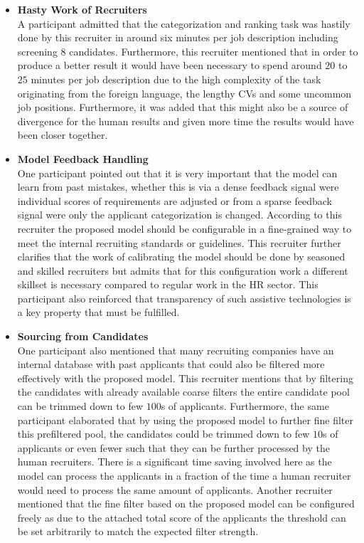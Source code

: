 \documentclass[draft,final]{thesisclass} %
\begin{document}
\begin{enumerate}
\begin{itemize}
        \item \textbf{Hasty Work of Recruiters}\\
        A participant admitted that the categorization and ranking task was hastily done by this recruiter in around six minutes per job description including screening $8$ candidates. Furthermore, this recruiter mentioned that in order to produce a better result it would have been necessary to spend around $20$ to $25$ minutes per job description due to the high complexity of the task originating from the foreign language, the lengthy \acs{CV}s and some uncommon job positions. Furthermore, it was added that this might also be a source of divergence for the human results and given more time the results would have been closer together.
        \item \textbf{Model Feedback Handling}\\
        One participant pointed out that it is very important that the model can learn from past mistakes, whether this is via a dense feedback signal were individual scores of requirements are adjusted or from a sparse feedback signal were only the applicant categorization is changed. According to this recruiter the proposed model should be configurable in a fine-grained way to meet the internal recruiting standards or guidelines. This recruiter further clarifies that the work of calibrating the model should be done by seasoned and skilled recruiters but admits that for this configuration work a different skillset is necessary compared to regular work in the \acs{HR} sector. This participant also reinforced that transparency of such assistive technologies is a key property that must be fulfilled.
        \item \textbf{Sourcing from Candidates}\\
        One participant also mentioned that many recruiting companies have an internal database with past applicants that could also be filtered more effectively with the proposed model. This recruiter mentions that by filtering the candidates with already available coarse filters the entire candidate pool can be trimmed down to few $100$s of applicants. Furthermore, the same participant elaborated that by using the proposed model to further fine filter this prefiltered pool, the candidates could be trimmed down to few $10$s of applicants or even fewer such that they can be further processed by the human recruiters. There is a significant time saving involved here as the model can process the applicants in a fraction of the time a human recruiter would need to process the same amount of applicants. Another recruiter mentioned that the fine filter based on the proposed model can be configured freely as due to the attached total score of the applicants the threshold can be set arbitrarily to match the expected filter strength.

\end{itemize}
\end{enumerate}
\end{document}
